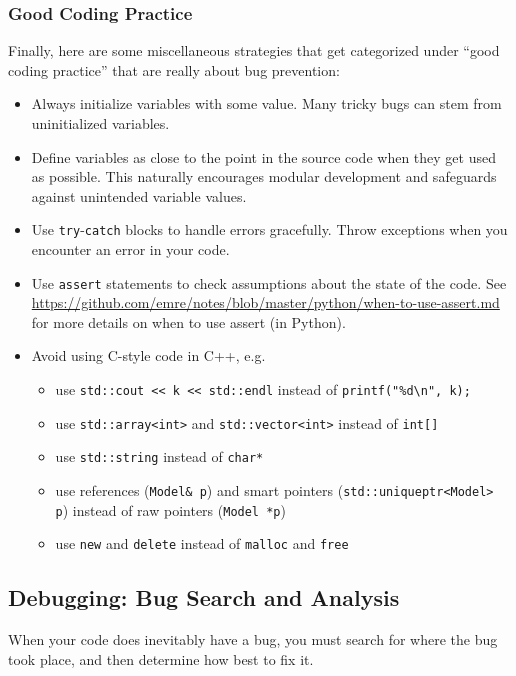 \documentclass[12pt]{article}
\begin{document}
\subsubsection{Good Coding Practice}
Finally, here are some miscellaneous strategies that get categorized under ``good coding practice'' that are really about bug prevention:
\begin{itemize}
    \item Always initialize variables with some value. Many tricky bugs can stem from uninitialized variables.
    \item Define variables as close to the point in the source code when they get used as possible. This naturally encourages modular development and safeguards against unintended variable values.
    \item Use \texttt{try}-\texttt{catch} blocks to handle errors gracefully. Throw exceptions when you encounter an error in your code.
    \item Use \texttt{assert} statements to check assumptions about the state of the code. See \url{https://github.com/emre/notes/blob/master/python/when-to-use-assert.md} for more details on when to use assert (in Python).
    \item Avoid using C-style code in C++, e.g.
        \begin{itemize}
            \item use \texttt{std::cout << k << std::endl} instead of \verb+printf("%d\n", k);+
            \item use \texttt{std::array<int>} and \texttt{std::vector<int>} instead of \texttt{int[]}
            \item use \texttt{std::string} instead of \texttt{char*}
            \item use references (\texttt{Model\& p}) and smart pointers (\texttt{std::unique\ttul ptr<Model> p}) instead of raw pointers (\texttt{Model *p})
            \item use \texttt{new} and \texttt{delete} instead of \texttt{malloc} and \texttt{free}
        \end{itemize}
\end{itemize}

\subsection{Debugging: Bug Search and Analysis}
When your code does inevitably have a bug, you must search for where the bug took place, and then determine how best to fix it.
\end{document}
